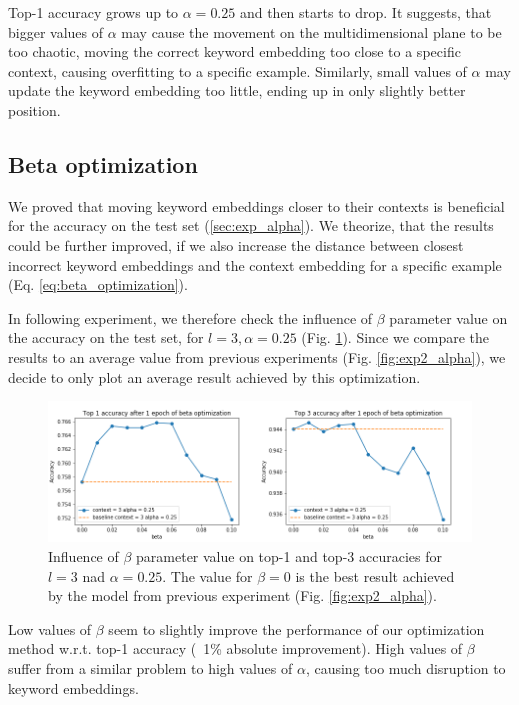 \documentclass{llncs}
\begin{document}
Top-1 accuracy grows up to \(\alpha=0.25\) and then starts to drop.
It suggests, that bigger values of \(\alpha\) may cause the movement on the multidimensional plane to be too chaotic, moving the correct keyword embedding too close to a specific context, causing overfitting to a specific example.
Similarly, small values of \(\alpha\) may update the keyword embedding too little, ending up in only slightly better position.

\subsection{Beta optimization}
We proved that moving keyword embeddings closer to their contexts is beneficial for the accuracy on the test set (\ref{sec:exp_alpha}).
We theorize, that the results could be further improved, if we also increase the distance between closest incorrect keyword embeddings and the context embedding for a specific example (Eq. \ref{eq:beta_optimization}).

In following experiment, we therefore check the influence of \(\beta\) parameter value on the accuracy on the test set, for \(l=3, \alpha=0.25\) (Fig. \ref{fig:exp3_beta}).
Since we compare the results to an average value from previous experiments (Fig. \ref{fig:exp2_alpha}), we decide to only plot an average result achieved by this optimization.

\begin{figure}[H]
    \centering
    \caption{Influence of \(\beta\) parameter value on top-1 and top-3 accuracies for \(l=3\) nad \(\alpha=0.25\). The value for \(\beta=0\) is the best result achieved by the model from previous experiment (Fig. \ref{fig:exp2_alpha}).}
    \label{fig:exp3_beta}
    \includegraphics[scale=0.6]{res/exp3_beta_top_acc.png}
\end{figure}

Low values of \(\beta\) seem to slightly improve the performance of our optimization method w.r.t. top-1 accuracy (~1\% absolute improvement).
High values of \(\beta\) suffer from a similar problem to high values of \(\alpha\), causing too much disruption to keyword embeddings.
\end{document}
